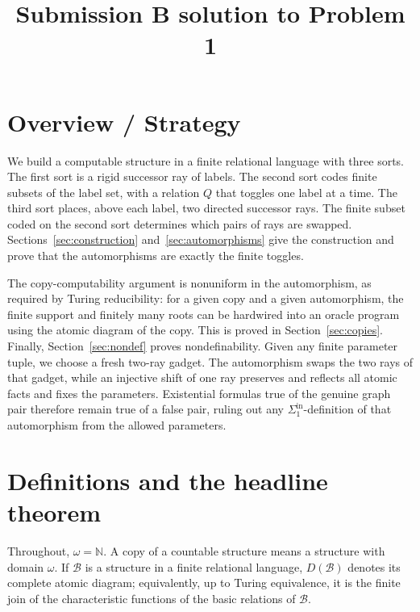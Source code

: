 \documentclass[12pt]{article}
\theoremstyle{definition}
\theoremstyle{remark}
\begin{document}
\title{Submission B solution to Problem 1}
\date{}
\maketitle

\section*{Overview / Strategy}

We build a computable structure in a finite relational language with three sorts.  The first sort is a rigid successor ray of labels.  The second sort codes finite subsets of the label set, with a relation \(Q\) that toggles one label at a time.  The third sort places, above each label, two directed successor rays.  The finite subset coded on the second sort determines which pairs of rays are swapped.  Sections~\ref{sec:construction} and~\ref{sec:automorphisms} give the construction and prove that the automorphisms are exactly the finite toggles.

The copy-computability argument is nonuniform in the automorphism, as required by Turing reducibility: for a given copy and a given automorphism, the finite support and finitely many roots can be hardwired into an oracle program using the atomic diagram of the copy.  This is proved in Section~\ref{sec:copies}.  Finally, Section~\ref{sec:nondef} proves nondefinability.  Given any finite parameter tuple, we choose a fresh two-ray gadget.  The automorphism swaps the two rays of that gadget, while an injective shift of one ray preserves and reflects all atomic facts and fixes the parameters.  Existential formulas true of the genuine graph pair therefore remain true of a false pair, ruling out any \(\Sigma^{\mathrm{in}}_1\)-definition of that automorphism from the allowed parameters.

\section{Definitions and the headline theorem}

Throughout, \(\omega=\mathbb N\).  A copy of a countable structure means a structure with domain \(\omega\).  If \(\mathcal B\) is a structure in a finite relational language, \(D(\mathcal B)\) denotes its complete atomic diagram; equivalently, up to Turing equivalence, it is the finite join of the characteristic functions of the basic relations of \(\mathcal B\).
\end{document}
